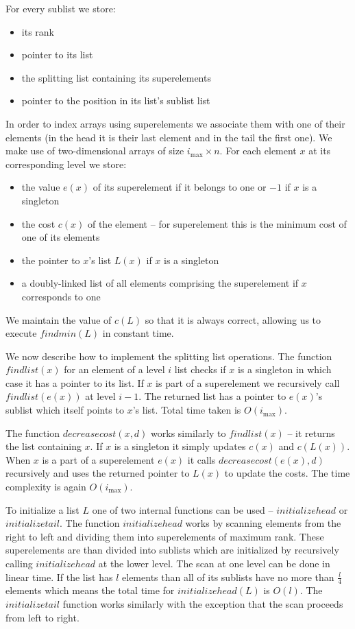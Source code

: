 For every sublist we store:

\begin{itemize}
    \item its rank
    \item pointer to its list
    \item the splitting list containing its superelements
    \item pointer to the position in its list's sublist list
\end{itemize}

In order to index arrays using superelements we associate them with one of their elements (in the head it is their last element and in the tail the first one). We make use of two-dimensional arrays of size $i_{\max} \times n$. For each element $x$ at its corresponding level we store:

\begin{itemize}
    \item the value $e(x)$ of its superelement if it belongs to one or $-1$ if $x$ is a singleton
    \item the cost $c(x)$ of the element – for superelement this is the minimum cost of one of its elements
    \item the pointer to $x$'s list $L(x)$ if $x$ is a singleton
    \item a doubly-linked list of all elements comprising the superelement if $x$ corresponds to one
\end{itemize}

We maintain the value of $c(L)$ so that it is always correct, allowing us to execute $findmin(L)$ in constant time.

We now describe how to implement the splitting list operations. The function $findlist(x)$ for an element of a level $i$ list checks if $x$ is a singleton in which case it has a pointer to its list. If $x$ is part of a superelement we recursively call $findlist(e(x))$ at level $i-1$. The returned list has a pointer to $e(x)$'s sublist which itself points to $x$'s list. Total time taken is $O(i_{\max})$.

The function $decreasecost(x, d)$ works similarly to $findlist(x)$ – it returns the list containing $x$. If $x$ is a singleton it simply updates $c(x)$ and $c(L(x))$. When $x$ is a part of a superelement $e(x)$ it calls $decreasecost(e(x), d)$ recursively and uses the returned pointer to $L(x)$ to update the costs. The time complexity is again $O(i_{\max})$.

To initialize a list $L$ one of two internal functions can be used – $initializehead$ or $initializetail$. The function $initializehead$ works by scanning elements from the right to left and dividing them into superelements of maximum rank. These superelements are than divided into sublists which are initialized by recursively calling $initializehead$ at the lower level. The scan at one level can be done in linear time. If the list has $l$ elements than all of its sublists have no more than $\frac{l}{4}$ elements which means the total time for $initializehead(L)$ is $O(l)$. The $initializetail$ function works similarly with the exception that the scan proceeds from left to right.

